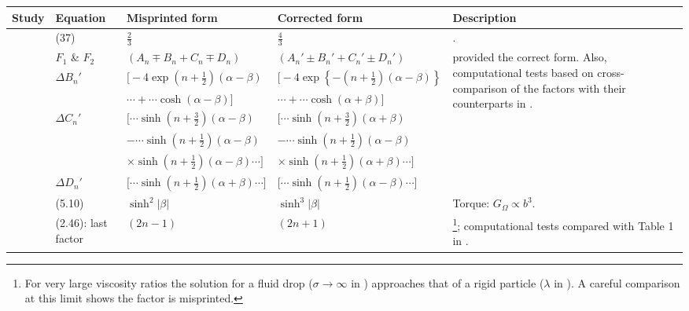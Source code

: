 \documentclass[../thesis.tex]{subfiles}
\begin{document}
\begin{landscape}

\begin{longtable}{p{3cm}p{3cm}p{5.0cm}p{5.25cm}p{5.5cm}}
 \hline
 Study & Equation & Misprinted form & Corrected form & Description \\ \hline
 \cite{SJ26} & (37) & $\frac{2}{3}$ & $\frac{4}{3}$ & \cite{HB83,M61}.\\ \hline
 
 \cite{M61} & $F_1$ \& $F_2$ & $(A_n \mp B_n + C_n \mp D_n)$ & $(A_n' \pm B_n' + C_n' \pm D_n')$ & \multirow[t]{7}{5.5cm}{\cite{GMS20} provided the correct form. Also, computational tests based on cross-comparison of the factors with their counterparts in \cite{SJ26}.} \\ \cline{2-4}
 & $\Delta B_n'$ & $\big[-4\exp\left(n+\tfrac{1}{2}\right)\left(\alpha-\beta\right)$ & $\big[-4\exp\left\{-\left(n+\tfrac{1}{2}\right)\left(\alpha-\beta\right)\right\}$ & \\ 
 & & $\cdots+\cdots\cosh\left(\alpha-\beta\right)\big]$ & $\cdots+\cdots\cosh\left(\alpha+\beta\right)\big]$ & \\ \cline{2-4}
 & $\Delta C_n'$ & $\big[\cdots\sinh\left(n+\tfrac{3}{2}\right)\left(\alpha-\beta\right)$ & $\big[\cdots\sinh\left(n+\tfrac{3}{2}\right)\left(\alpha+\beta\right)$ & \\ 
 & & $- \cdots\sinh\left(n+\tfrac{1}{2}\right)\left(\alpha-\beta\right)$ & $- \cdots\sinh\left(n+\tfrac{1}{2}\right)\left(\alpha-\beta\right)$ & \\
 & & $\times\sinh\left(n+\tfrac{1}{2}\right)\left(\alpha-\beta\right) \cdots \big]$ & $\times\sinh\left(n+\tfrac{1}{2}\right)\left(\alpha+\beta\right) \cdots \big]$ & \\ \cline{2-4}
 & $\Delta D_n'$ & $\big[\cdots\sinh\left(n+\tfrac{1}{2}\right)\left(\alpha+\beta\right) \cdots \big]$ & $\big[\cdots\sinh\left(n+\tfrac{1}{2}\right)\left(\alpha-\beta\right) \cdots \big]$ &
  \\ \hline
  
 \cite{ONM70} & (5.10) & $\sinh^2|\beta|$ & $\sinh^3|\beta|$ & Torque: $G_\Omega \propto b^3$.
 \\ \hline
 
 \cite{WW72} & (2.46): last factor & $\left(2n-1\right)$ & $\left(2n+1\right)$ & \footnote{For very large viscosity ratios the solution for a fluid drop ($\sigma\to\infty$ in \cite{WW72}) approaches that of a rigid particle ($\lambda$ in \cite{SJ26}). A careful comparison at this limit shows the factor is misprinted.}\cite{SJ26}; computational tests compared with Table 1 in \cite{WW72}.
 \\ \hline
 

\end{longtable}
\end{landscape}
\end{document}
